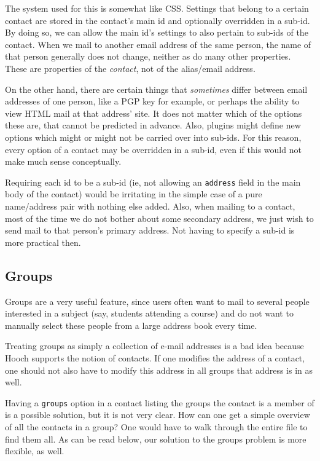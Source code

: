 \documentclass[a4paper]{article}
\begin{document}
The system used for this is somewhat like CSS.  Settings that belong to a
certain contact are stored in the contact's main id and optionally
overridden in a sub-id.  By doing so, we can allow the main id's settings
to also pertain to sub-ids of the contact.  When we mail to another email
address of the same person, the name of that person generally does not
change, neither as do many other properties.  These are properties of
the \emph{contact}, not of the alias/email address.

On the other hand, there are certain things that \emph{sometimes} differ
between email addresses of one person, like a PGP key for example, or
perhaps the ability to view HTML mail at that address' site.  It does not
matter which of the options these are, that cannot be predicted in advance.
Also, plugins might define new options which might or might not be carried
over into sub-ids.  For this reason, every option of a contact may be
overridden in a sub-id, even if this would not make much sense conceptually.

Requiring each id to be a sub-id (ie, not allowing an \texttt{address}
field in the main body of the contact) would be irritating in the simple
case of a pure name/address pair with nothing else added.  Also, when
mailing to a contact, most of the time we do not bother about some
secondary address, we just wish to send mail to that person's primary
address.  Not having to specify a sub-id is more practical then.


\subsection{Groups}

Groups are a very useful feature, since users often want to mail to
several people interested in a subject (say, students attending a course)
and do not want to manually select these people from a large address
book every time.

Treating groups as simply a collection of e-mail addresses is a bad idea
because Hooch supports the notion of contacts.  If one modifies the
address of a contact, one should not also have to modify this address in
all groups that address is in as well.

Having a \texttt{groups} option in a contact listing the groups the
contact is a member of is a possible solution, but it is not very clear.
How can one get a simple overview of all the contacts in a group?  One would
have to walk through the entire file to find them all.  As can be read
below, our solution to the groups problem is more flexible, as well.
\end{document}
